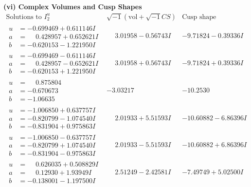 \documentclass[1p]{elsarticle_modified}
\theoremstyle{definition}
\newcommand{\I}{\sqrt{-1}}
\begin{document}
\newpage\flushleft \textbf{(vi) Complex Volumes and Cusp Shapes}
$$\begin{array}{c|c|c}  
\text{Solutions to }I^u_{2}& \I (\text{vol} + \sqrt{-1}CS) & \text{Cusp shape}\\
 \hline 
\begin{aligned}
u &= -0.699469 + 0.611146 I \\
a &= \phantom{-}0.428957 + 0.652621 I \\
b &= -0.620153 - 1.221950 I\end{aligned}
 & \phantom{-}3.01958 - 0.56743 I & -9.71824 - 0.39336 I \\ \hline\begin{aligned}
u &= -0.699469 - 0.611146 I \\
a &= \phantom{-}0.428957 - 0.652621 I \\
b &= -0.620153 + 1.221950 I\end{aligned}
 & \phantom{-}3.01958 + 0.56743 I & -9.71824 + 0.39336 I \\ \hline\begin{aligned}
u &= \phantom{-}0.875804\phantom{ +0.000000I} \\
a &= -0.670673\phantom{ +0.000000I} \\
b &= -1.06635\phantom{ +0.000000I}\end{aligned}
 & -3.03217\phantom{ +0.000000I} & -10.2530\phantom{ +0.000000I} \\ \hline\begin{aligned}
u &= -1.006850 + 0.637757 I \\
a &= -0.820799 - 1.074540 I \\
b &= -0.831904 + 0.975863 I\end{aligned}
 & \phantom{-}2.01933 + 5.51593 I & -10.60882 - 6.86396 I \\ \hline\begin{aligned}
u &= -1.006850 - 0.637757 I \\
a &= -0.820799 + 1.074540 I \\
b &= -0.831904 - 0.975863 I\end{aligned}
 & \phantom{-}2.01933 - 5.51593 I & -10.60882 + 6.86396 I \\ \hline\begin{aligned}
u &= \phantom{-}0.626035 + 0.508829 I \\
a &= \phantom{-}0.12930 + 1.93949 I \\
b &= -0.138001 - 1.197500 I\end{aligned}
 & \phantom{-}2.51249 - 2.42581 I & -7.49749 + 5.02500 I \\ \hline\begin{aligned}

\end{aligned}
\end{array}$$
\end{document}
